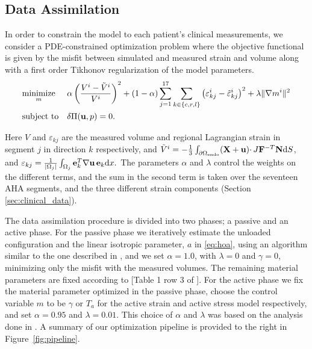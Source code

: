 \subsection{Data Assimilation}
In order to constrain the model to each patient's clinical measurements, we
consider a PDE-constrained optimization problem where
the objective functional is given by the misfit between
simulated and measured strain and volume along with a first order Tikhonov regularization of the
model parameters.
\begin{equation}
  \begin{aligned}
    \label{eq:pde_opt}
    & \underset{m}{\text{minimize}}
    & &  \alpha \left( \frac{V^i - \tilde{V}^i}{V^i} \right)^2
    + (1-\alpha)  \sum_{j= 1}^{17} \sum_{k \in \{c,r,l\}}  \left( \varepsilon_{kj}^i
      -  \tilde{\varepsilon}_{kj}^i \right)^2
    + \lambda \| \nabla m^i \|^2 \\
    & \text{subject to}
    & & \delta \Pi(\mathbf{u}, p) = 0.
  \end{aligned}
\end{equation}


Here $V$ and $\varepsilon_{kj}$ are the measured volume and regional Lagrangian strain in
segment $j$ in direction $k$ respectively, and $\tilde{V}^i =
-\frac{1}{3} \int_{\partial \Omega_{\text{endo}}} (\mathbf{X} + \mathbf{u})
\cdotp J\mathbf{F}^{-T}\mathbf{N}  \mathrm{d}S$,  and $\varepsilon_{kj} =
\frac{1}{|\Omega_j|}\int_{\Omega_j}  \mathbf{e}_k^T \nabla \mathbf{u} \,
\mathbf{e}_k  \mathrm{d}x.$ 
The parameters $\alpha$ and $\lambda$
control the weights on the different terms, and the sum in the second
term is taken over the seventeen AHA
segments, and the three different strain components (Section \ref{sec:clinical_data}).


The data assimilation procedure is divided into two phases; a passive
and an active phase. For the passive phase we iteratively
  estimate the unloaded configuration and the linear isotropic parameter, $a$ in
\eqref{eq:hoa}, using an algorithm similar to the one described in
\cite{nikou2016effects}, and we set $\alpha= 1.0$,  with $\lambda = 0$ and
$\gamma = 0$, minimizing only the misfit with the measured volumes. The
remaining material parameters are fixed according to [Table 1 row 3 of
\cite{holzapfel2009constitutive}]. For the active phase we fix the material parameter optimized in the
passive phase, choose the control variable $m$ to be $\gamma$ or
$T_a$ for the active strain and active stress model respectively, and
set $\alpha = 0.95$ and $\lambda = 0.01$. This choice of $\alpha$ and
$\lambda$ was based on the analysis done in \cite{balaban}. A summary
of our optimization pipeline is provided to the right in
Figure~\ref{fig:pipeline}.





